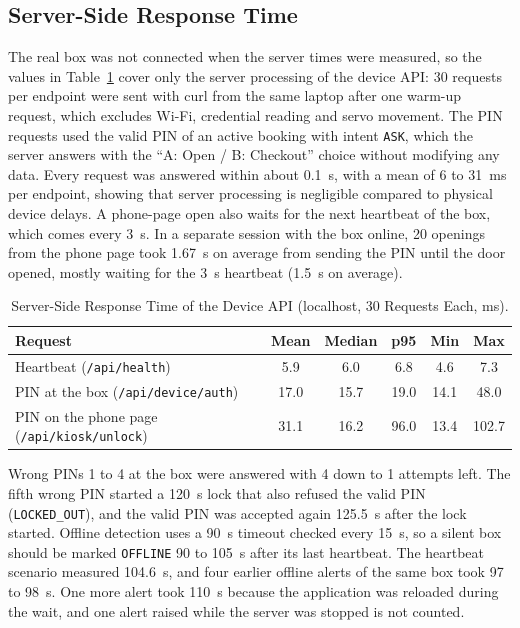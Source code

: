 \documentclass[journal,onecolumn]{IEEEtran}
\begin{document}
\subsection{Server-Side Response Time}
\label{sec:latency}

The real box was not connected when the server times were measured, so the values in Table~\ref{tab:latency} cover
only the server processing of the device API: 30 requests per endpoint were sent with curl from the same laptop after
one warm-up request, which excludes Wi-Fi, credential reading and servo movement. The PIN requests used the valid PIN
of an active booking with intent \texttt{ASK}, which the server answers with the ``A: Open / B: Checkout'' choice without
modifying any data. Every request was answered within about 0.1~s, with a mean of 6 to 31~ms per endpoint, showing that
server processing is negligible compared to physical device delays. A phone-page open also waits for the next heartbeat
of the box, which comes every 3~s. In a separate session with the box online, 20 openings from the phone page took
1.67~s on average from sending the PIN until the door opened, mostly waiting for the 3~s heartbeat (1.5~s on average).

\begin{table}[!htbp]
\renewcommand{\arraystretch}{1.02}
\centering
\small
\caption{Server-Side Response Time of the Device API (localhost, 30 Requests Each, ms).}
\label{tab:latency}
\vspace{5pt}
\begin{tabular}{l c c c c c}
\hline
Request & Mean & Median & p95 & Min & Max \\
\hline
Heartbeat (\texttt{/api/health})                     & 5.9  & 6.0  & 6.8  & 4.6  & 7.3 \\
PIN at the box (\texttt{/api/device/auth})           & 17.0 & 15.7 & 19.0 & 14.1 & 48.0 \\
PIN on the phone page (\texttt{/api/kiosk/unlock})   & 31.1 & 16.2 & 96.0 & 13.4 & 102.7 \\
\hline
\end{tabular}
\end{table}

Wrong PINs 1 to 4 at the box were answered with 4 down to 1 attempts left. The fifth wrong PIN started a 120~s lock
that also refused the valid PIN (\texttt{LOCKED\_OUT}), and the valid PIN was accepted again 125.5~s after the lock
started. Offline detection uses a 90~s timeout checked every 15~s, so a silent box should be marked \texttt{OFFLINE}
90 to 105~s after its last heartbeat. The heartbeat scenario measured 104.6~s, and four earlier offline alerts of the
same box took 97 to 98~s. One more alert took 110~s because the application was reloaded during the wait, and one alert
raised while the server was stopped is not counted.
\end{document}
